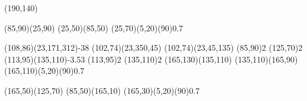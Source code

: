 \documentclass{standalone}
\begin{document}
\begin{axopicture}(190,140)

  \Line[arrow](85,90)(25,90)                     %
  \Line[arrow](25,50)(85,50)                     %
  \GOval(25,70)(5,20)(90){0.7}                   %
                                                 
  \PhotonArc(108,86)(23,171,312){-3}{8}          %
  \Arc[arrow,arrowpos=0.65](102,74)(23,350,45)   %
  \Arc[arrow,arrowpos=0.55](102,74)(23,45,135)   %
  \Vertex(85,90){2}                              %
  \Vertex(125,70){2}                             %
  \Gluon(113,95)(135,110){-3.5}{3}               %
  \Vertex(113,95){2}                             %
  \Vertex(135,110){2}                            %
  \Line[arrow](165,130)(135,110)                 %
  \Line[arrow](135,110)(165,90)                  %
  \GOval(165,110)(5,20)(90){0.7}                 %
                                                 
  \Line[arrow](165,50)(125,70)                   %
  \Line[arrow](85,50)(165,10)                    %
  \GOval(165,30)(5,20)(90){0.7}                  %
                                                 
\end{axopicture}
\end{document}
